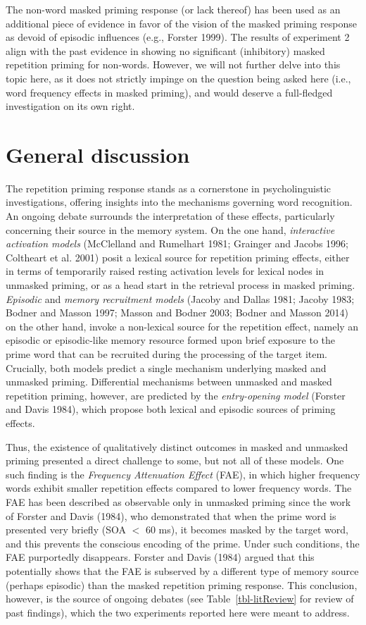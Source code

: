\documentclass[
]{interact}
\begin{document}
The non-word masked priming response (or lack thereof) has been used as
an additional piece of evidence in favor of the vision of the masked
priming response as devoid of episodic influences (e.g., Forster 1999).
The results of experiment 2 align with the past evidence in showing no
significant (inhibitory) masked repetition priming for non-words.
However, we will not further delve into this topic here, as it does not
strictly impinge on the question being asked here (i.e., word frequency
effects in masked priming), and would deserve a full-fledged
investigation on its own right.

\section{General discussion}\label{sec-discussion}

The repetition priming response stands as a cornerstone in
psycholinguistic investigations, offering insights into the mechanisms
governing word recognition. An ongoing debate surrounds the
interpretation of these effects, particularly concerning their source in
the memory system. On the one hand, \emph{interactive activation models}
(McClelland and Rumelhart 1981; Grainger and Jacobs 1996; Coltheart et
al. 2001) posit a lexical source for repetition priming effects, either
in terms of temporarily raised resting activation levels for lexical
nodes in unmasked priming, or as a head start in the retrieval process
in masked priming. \emph{Episodic} and \emph{memory recruitment models}
(Jacoby and Dallas 1981; Jacoby 1983; Bodner and Masson 1997; Masson and
Bodner 2003; Bodner and Masson 2014) on the other hand, invoke a
non-lexical source for the repetition effect, namely an episodic or
episodic-like memory resource formed upon brief exposure to the prime
word that can be recruited during the processing of the target item.
Crucially, both models predict a single mechanism underlying masked and
unmasked priming. Differential mechanisms between unmasked and masked
repetition priming, however, are predicted by the \emph{entry-opening
model} (Forster and Davis 1984), which propose both lexical and episodic
sources of priming effects.

Thus, the existence of qualitatively distinct outcomes in masked and
unmasked priming presented a direct challenge to some, but not all of
these models. One such finding is the \emph{Frequency Attenuation
Effect} (FAE), in which higher frequency words exhibit smaller
repetition effects compared to lower frequency words. The FAE has been
described as observable only in unmasked priming since the work of
Forster and Davis (1984), who demonstrated that when the prime word is
presented very briefly (SOA \(<\) 60 ms), it becomes masked by the
target word, and this prevents the conscious encoding of the prime.
Under such conditions, the FAE purportedly disappears. Forster and Davis
(1984) argued that this potentially shows that the FAE is subserved by a
different type of memory source (perhaps episodic) than the masked
repetition priming response. This conclusion, however, is the source of
ongoing debates (see Table~\ref{tbl-litReview} for review of past
findings), which the two experiments reported here were meant to
address.
\end{document}
